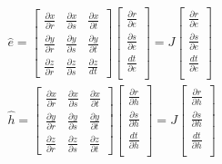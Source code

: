 \documentclass[11pt]{article}
\begin{document}
\begin{eqnarray}
  \hat{e} =
  \begin{bmatrix}
  \frac{\partial x}{\partial r} & \frac{\partial x}{\partial s} & \frac{\partial x}{\partial t}\\
  \frac{\partial y}{\partial r} & \frac{\partial y}{\partial s} & \frac{\partial y}{\partial t}\\
  \frac{\partial z}{\partial r} & \frac{\partial z}{\partial s} & \frac{\partial z}{dt}
  \end{bmatrix}
  \begin{bmatrix}
    \frac{\partial r}{\partial e} \\
    \frac{\partial s}{\partial e} \\
    \frac{dt}{\partial e} \\
  \end{bmatrix}
  = J
  \begin{bmatrix}
    \frac{\partial r}{\partial e}\\
    \frac{\partial s}{\partial e}\\
    \frac{dt}{\partial e}\\
  \end{bmatrix} \\
    \hat{h} =
  \begin{bmatrix}
  \frac{\partial x}{\partial r} & \frac{\partial x}{\partial s} & \frac{\partial x}{\partial t}\\
  \frac{\partial y}{\partial r} & \frac{\partial y}{\partial s} & \frac{\partial y}{\partial t}\\
  \frac{\partial z}{\partial r} & \frac{\partial z}{\partial s} & \frac{\partial z}{\partial t}
  \end{bmatrix}
  \begin{bmatrix}
    \frac{\partial r}{\partial h} \\
    \frac{\partial s}{\partial h} \\
    \frac{dt}{\partial h} \\
  \end{bmatrix}
  = J
  \begin{bmatrix}
    \frac{\partial r}{\partial h}\\
    \frac{\partial s}{\partial h}\\
    \frac{dt}{\partial h}\\
  \end{bmatrix}
\end{eqnarray}
\end{document}
